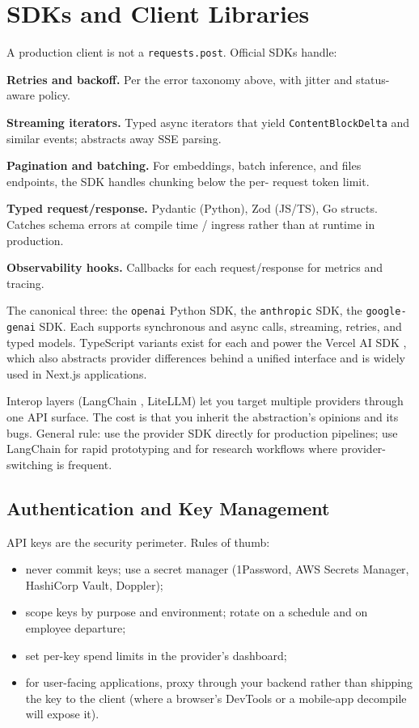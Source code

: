 \section{SDKs and Client Libraries}

A production client is not a \texttt{requests.post}. Official
SDKs handle:

\textbf{Retries and backoff.} Per the error taxonomy above, with
jitter and status-aware policy.

\textbf{Streaming iterators.} Typed async iterators that yield
\texttt{ContentBlockDelta} and similar events; abstracts away
SSE parsing.

\textbf{Pagination and batching.} For embeddings, batch inference,
and files endpoints, the SDK handles chunking below the per-
request token limit.

\textbf{Typed request/response.} Pydantic (Python), Zod
(JS/TS), Go structs. Catches schema errors at compile time /
ingress rather than at runtime in production.

\textbf{Observability hooks.} Callbacks for each request/response
for metrics and tracing.

The canonical three: the \texttt{openai} Python SDK, the
\texttt{anthropic} SDK, the \texttt{google-genai} SDK. Each
supports synchronous and async calls, streaming, retries, and
typed models. TypeScript variants exist for each and power the
Vercel AI SDK \citep{vercel_ai_sdk}, which also abstracts
provider differences behind a unified interface and is widely
used in Next.js applications.

Interop layers (LangChain \citep{langchain_docs}, LiteLLM) let
you target multiple providers through one API surface. The cost
is that you inherit the abstraction's opinions and its bugs.
General rule: use the provider SDK directly for production
pipelines; use LangChain for rapid prototyping and for research
workflows where provider-switching is frequent.

\subsection{Authentication and Key Management}

API keys are the security perimeter. Rules of thumb:
\begin{itemize}
  \item never commit keys; use a secret manager (1Password, AWS
        Secrets Manager, HashiCorp Vault, Doppler);
  \item scope keys by purpose and environment; rotate on a
        schedule and on employee departure;
  \item set per-key spend limits in the provider's dashboard;
  \item for user-facing applications, proxy through your backend
        rather than shipping the key to the client (where a
        browser's DevTools or a mobile-app decompile will expose
        it).
\end{itemize}

